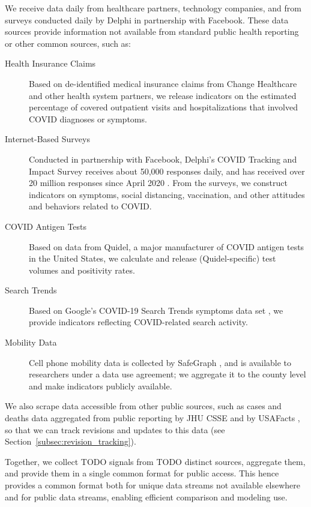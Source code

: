 \documentclass[9pt,twocolumn,twoside,lineno]{pnas-new}
\begin{document}
We receive data daily from healthcare partners, technology companies, and from
surveys conducted daily by Delphi in partnership with Facebook. These data
sources provide information not available from standard public health reporting
or other common sources, such as:
\begin{description}
\item[Health Insurance Claims] Based on de-identified medical insurance claims
  from Change Healthcare and other health system partners, we release indicators
  on the estimated percentage of covered outpatient visits and hospitalizations
  that involved COVID diagnoses or symptoms.
\item[Internet-Based Surveys] Conducted in partnership with Facebook, Delphi's
  COVID Tracking and Impact Survey receives about 50,000 responses daily, and
  has received over 20 million responses since April 2020 \cite{DelphiSurvey,
    Kreuter:2020}. From the surveys, we construct indicators on symptoms,
  social distancing, vaccination, and other attitudes and behaviors related to
  COVID.
\item[COVID Antigen Tests] Based on data from Quidel, a major manufacturer of
  COVID antigen tests in the United States, we calculate and release
  (Quidel-specific) test volumes and positivity rates.
\item[Search Trends] Based on Google's COVID-19 Search Trends symptoms data set
  \cite{GoogleSymptoms}, we provide indicators reflecting COVID-related search
  activity.
\item[Mobility Data] Cell phone mobility data is collected by SafeGraph
  \cite{SafeGraphSD, SafeGraphPatterns}, and is available to researchers under a
  data use agreement; we aggregate it to the county level and make indicators
  publicly available.
\end{description}

We also scrape data accessible from other public sources, such as cases and
deaths data aggregated from public reporting by JHU CSSE \cite{Dong:2020} and by
USAFacts \cite{USAFacts}, so that we can track revisions and updates to this data
(see Section~\ref{subsec:revision_tracking}).

Together, we collect TODO signals from TODO distinct sources, aggregate them,
and provide them in a single common format for public access. This hence
provides a common format both for unique data streams not available elsewhere
and for public data streams, enabling efficient comparison and modeling use.
\end{document}
